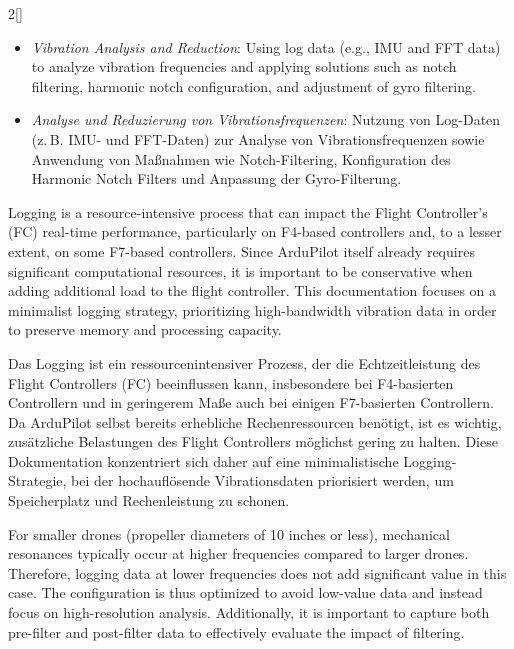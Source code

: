 \begin{paracol}{2}[]
\coleng

\begin{itemize}
\item \textsl{Vibration Analysis and Reduction}: Using log data (e.g., IMU and FFT data) to analyze vibration frequencies and applying solutions such as notch filtering, harmonic notch configuration, and adjustment of gyro filtering.
\end{itemize}

\colger

\begin{itemize}
\item \textsl{Analyse und Reduzierung von Vibrationsfrequenzen}: Nutzung von Log-Daten (z.\,B. IMU- und FFT-Daten) zur Analyse von Vibrationsfrequenzen sowie Anwendung von Maßnahmen wie Notch-Filtering, Konfiguration des Harmonic Notch Filters und Anpassung der Gyro-Filterung.
\end{itemize}

\colende

\renewcommand{\deutschertitel}{Log-Konfiguration}
\renewcommand{\englischertitel}{Log Configuration}
\makrounterabschnitt
\label{ArdupilotLogConfiguration}

Logging is a resource-intensive process that can impact the Flight Controller’s (FC) real-time performance, particularly on F4-based controllers and, to a lesser extent, on some F7-based controllers. Since ArduPilot itself already requires significant computational resources, it is important to be conservative when adding additional load to the flight controller. This documentation focuses on a minimalist logging strategy, prioritizing high-bandwidth vibration data in order to preserve memory and processing capacity.

\colger

Das Logging ist ein ressourcenintensiver Prozess, der die Echtzeitleistung des Flight Controllers (FC) beeinflussen kann, insbesondere bei F4-basierten Controllern und in geringerem Maße auch bei einigen F7-basierten Controllern. Da ArduPilot selbst bereits erhebliche Rechenressourcen benötigt, ist es wichtig, zusätzliche Belastungen des Flight Controllers möglichst gering zu halten. Diese Dokumentation konzentriert sich daher auf eine minimalistische Logging-Strategie, bei der hochauflösende Vibrationsdaten priorisiert werden, um Speicherplatz und Rechenleistung zu schonen.

\coleng

For smaller drones (propeller diameters of 10 inches or less), mechanical resonances typically occur at higher frequencies compared to larger drones. Therefore, logging data at lower frequencies does not add significant value in this case. The configuration is thus optimized to avoid low-value data and instead focus on high-resolution analysis. Additionally, it is important to capture both pre-filter and post-filter data to effectively evaluate the impact of filtering.


\end{paracol}
